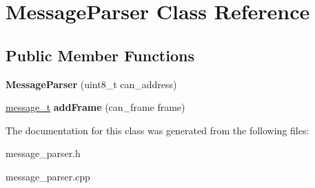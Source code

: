 \hypertarget{classMessageParser}{}\section{Message\+Parser Class Reference}
\label{classMessageParser}
\subsection*{Public Member Functions}
\begin{DoxyCompactItemize}
\item 
{\bfseries Message\+Parser} (uint8\+\_\+t can\+\_\+address)\hypertarget{classMessageParser_abd504499821ba3076c3b5fcbe9709f59}{}\label{classMessageParser_abd504499821ba3076c3b5fcbe9709f59}

\item 
\hyperlink{structMessage}{message\+\_\+t} {\bfseries add\+Frame} (can\+\_\+frame frame)\hypertarget{classMessageParser_a6106b34b152ee12e88e6a00cc88cb614}{}\label{classMessageParser_a6106b34b152ee12e88e6a00cc88cb614}

\end{DoxyCompactItemize}


The documentation for this class was generated from the following files\+:\begin{DoxyCompactItemize}
\item 
message\+\_\+parser.\+h\item 
message\+\_\+parser.\+cpp\end{DoxyCompactItemize}
